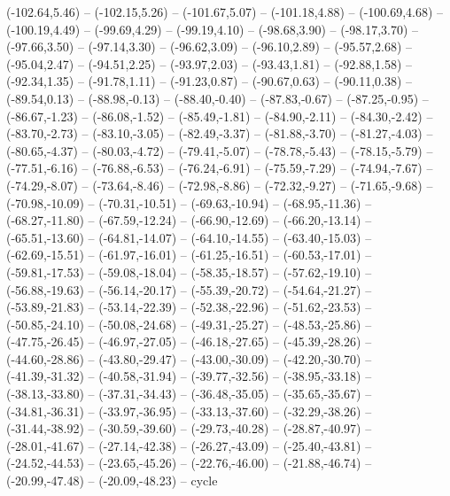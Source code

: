 {  (-102.64,5.46) -- (-102.15,5.26) -- (-101.67,5.07) -- (-101.18,4.88) -- (-100.69,4.68) -- (-100.19,4.49) -- (-99.69,4.29) --
  (-99.19,4.10) -- (-98.68,3.90) -- (-98.17,3.70) -- (-97.66,3.50) -- (-97.14,3.30) -- (-96.62,3.09) -- (-96.10,2.89) --
  (-95.57,2.68) -- (-95.04,2.47) -- (-94.51,2.25) -- (-93.97,2.03) -- (-93.43,1.81) -- (-92.88,1.58) -- (-92.34,1.35) --
  (-91.78,1.11) -- (-91.23,0.87) -- (-90.67,0.63) -- (-90.11,0.38) -- (-89.54,0.13) -- (-88.98,-0.13) -- (-88.40,-0.40) --
  (-87.83,-0.67) -- (-87.25,-0.95) -- (-86.67,-1.23) -- (-86.08,-1.52) -- (-85.49,-1.81) -- (-84.90,-2.11) -- (-84.30,-2.42) --
  (-83.70,-2.73) -- (-83.10,-3.05) -- (-82.49,-3.37) -- (-81.88,-3.70) -- (-81.27,-4.03) -- (-80.65,-4.37) -- (-80.03,-4.72) --
  (-79.41,-5.07) -- (-78.78,-5.43) -- (-78.15,-5.79) -- (-77.51,-6.16) -- (-76.88,-6.53) -- (-76.24,-6.91) -- (-75.59,-7.29) --
  (-74.94,-7.67) -- (-74.29,-8.07) -- (-73.64,-8.46) -- (-72.98,-8.86) -- (-72.32,-9.27) -- (-71.65,-9.68) -- (-70.98,-10.09) --
  (-70.31,-10.51) -- (-69.63,-10.94) -- (-68.95,-11.36) -- (-68.27,-11.80) -- (-67.59,-12.24) -- (-66.90,-12.69) -- (-66.20,-13.14) --
  (-65.51,-13.60) -- (-64.81,-14.07) -- (-64.10,-14.55) -- (-63.40,-15.03) -- (-62.69,-15.51) -- (-61.97,-16.01) -- (-61.25,-16.51) --
  (-60.53,-17.01) -- (-59.81,-17.53) -- (-59.08,-18.04) -- (-58.35,-18.57) -- (-57.62,-19.10) -- (-56.88,-19.63) -- (-56.14,-20.17) --
  (-55.39,-20.72) -- (-54.64,-21.27) -- (-53.89,-21.83) -- (-53.14,-22.39) -- (-52.38,-22.96) -- (-51.62,-23.53) -- (-50.85,-24.10) --
  (-50.08,-24.68) -- (-49.31,-25.27) -- (-48.53,-25.86) -- (-47.75,-26.45) -- (-46.97,-27.05) -- (-46.18,-27.65) -- (-45.39,-28.26) --
  (-44.60,-28.86) -- (-43.80,-29.47) -- (-43.00,-30.09) -- (-42.20,-30.70) -- (-41.39,-31.32) -- (-40.58,-31.94) -- (-39.77,-32.56) --
  (-38.95,-33.18) -- (-38.13,-33.80) -- (-37.31,-34.43) -- (-36.48,-35.05) -- (-35.65,-35.67) -- (-34.81,-36.31) -- (-33.97,-36.95) --
  (-33.13,-37.60) -- (-32.29,-38.26) -- (-31.44,-38.92) -- (-30.59,-39.60) -- (-29.73,-40.28) -- (-28.87,-40.97) -- (-28.01,-41.67) --
  (-27.14,-42.38) -- (-26.27,-43.09) -- (-25.40,-43.81) -- (-24.52,-44.53) -- (-23.65,-45.26) -- (-22.76,-46.00) -- (-21.88,-46.74) --
  (-20.99,-47.48) -- (-20.09,-48.23) -- cycle}
